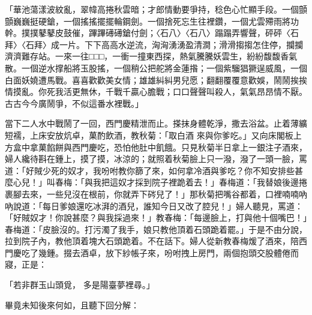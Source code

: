 \begin{showcontents}{}
「華池蕩漾波紋亂，翠幃高捲秋雲暗；才郎情動要爭持，稔色心忙顯手段。一個顫顫巍巍挺硬鎗，一個搖搖擺擺輪鋼劍。一個捨死忘生往裡鑽，一個尤雲殢雨將功幹。撲撲鼕鼕皮鼓催，蹕蹕礡礡鎗付劍；〈石八〉〈石八〉蹋蹋弄響聲，砰砰〈石拜〉〈石拜〉成一片。下下高高水逆流，洶洶湧湧盈清澗；滑滑搊搊怎住停，攔攔濟濟難存站。一來一往□□□，一衝一撞東西探，熱氣騰騰妖雲生，紛紛馥馥香氣散。一個逆水撑船將玉股搖，一個稍公把舵將金蓮揝；一個紫騮猖獗逞威風，一個白面妖嬈遭馬戰。喜喜歡歡美女情；雄雄糾糾男兒愿；翻翻覆覆意歡娛，鬧鬧挨挨情摸亂。你死我活更無休，千戰千贏心膽戰；口口聲聲叫殺人，氣氣昂昂情不厭。古古今今廣鬧爭，不似這番水裡戰。」

當下二人水中戰鬧了一回，西門慶精泄而止。搽抹身體乾淨，撒去浴盆。止着薄纊短襦，上床安放炕卓，菓酌飲酒，教秋菊：「取白酒 來與你爹吃。」又向床閣板上方盒中拿菓餡餅與西門慶吃，恐怕他肚中飢餓。只見秋菊半日拿上一銀注子酒來，婦人纔待斟在鍾上，摸了摸，冰涼的；就照着秋菊臉上只一潑，潑了一頭一臉，罵道：「好賊少死的奴才，我吩咐教你篩了來，如何拿冷酒與爹吃？你不知安排些甚麼心兒！」叫春梅：「與我把這奴才採到院子裡跪着去！」春梅道：「我替娘後邊捲裹腳去來，一些兒沒在根前，你就弄下硶兒了！」那秋菊把嘴谷都着，口裡喃喃吶吶說道：「每日爹娘還吃冰湃的酒兒，誰知今日又改了腔兒！」婦人聽見，罵道：「好賊奴才！你說甚麼？與我採過來！」教春梅：「每邊臉上，打與他十個嘴巴！」春梅道：「皮臉沒的。打污濁了我手，娘只教他頂着石頭跪着罷。」于是不由分說，拉到院子內，教他頂着塊大石頭跪着。不在話下。婦人從新教春梅煖了酒來，陪西門慶吃了幾鍾。掇去酒卓，放下紗帳子來，吩咐拽上房門，兩個抱頭交股體倦而寢，正是：

「若非群玉山頭覓，  多是陽臺夢裡尋。」

畢竟未知後來何如，且聽下回分解：





\end{showcontents}


